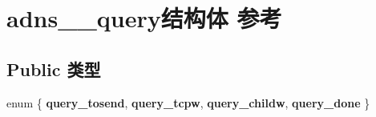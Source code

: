 \hypertarget{structadns____query}{}\section{adns\+\_\+\+\_\+query结构体 参考}
\label{structadns____query}
\subsection*{Public 类型}
\begin{DoxyCompactItemize}
\item 
\mbox{\label{structadns____query_af8ecc0c6fd600a7f3ce0791cc37c04bc}} 
enum \{ {\bfseries query\+\_\+tosend}, 
{\bfseries query\+\_\+tcpw}, 
{\bfseries query\+\_\+childw}, 
{\bfseries query\+\_\+done}
 \}
\end{DoxyCompactItemize}
